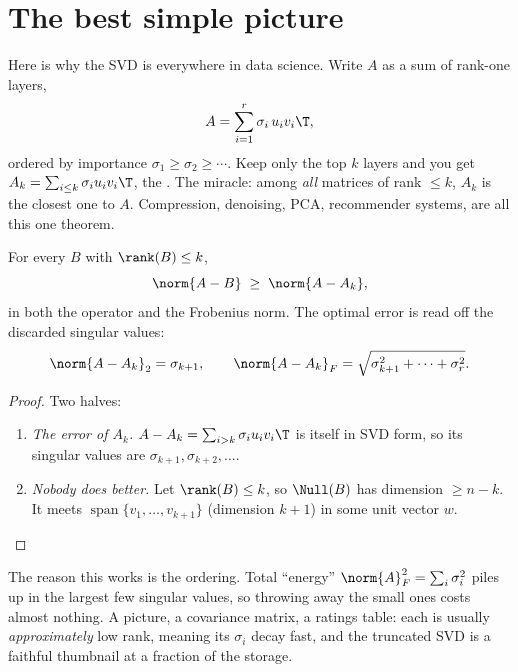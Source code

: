 \section{The best simple picture}\label{sec:eckart}
\quad{}

\begin{strand}
Here is why the SVD is everywhere in data science. Write $A$ as a sum of rank-one layers,
\[
  A=\sum_{i=1}^{r}\sigma_i\,u_i v_i\T ,
\]
ordered by importance $\sigma_1\ge\sigma_2\ge\cdots$. Keep only the top $k$ layers and you get
$A_k=\sum_{i\le k}\sigma_i u_i v_i\T$, the . The miracle: among \emph{all}
matrices of rank $\le k$, $A_k$ is the closest one to $A$. Compression, denoising, PCA,
recommender systems, are all this one theorem.
\end{strand}

\begin{theorem}\label{thm:ey}
For every $B$ with $\rank(B)\le k$,
\[
  \norm{A-B}\;\ge\;\norm{A-A_k},
\]
in both the operator and the Frobenius norm. The optimal error is read off the discarded
singular values:
\[
  \norm{A-A_k}_2=\sigma_{k+1},\qquad
  \norm{A-A_k}_F=\sqrt{\sigma_{k+1}^2+\cdots+\sigma_r^2}.
\]
\end{theorem}
\begin{proof}
Two halves:
\begin{enumerate}[leftmargin=2em,itemsep=1pt]
  \item \emph{The error of $A_k$.} $A-A_k=\sum_{i>k}\sigma_i u_i v_i\T$ is itself in SVD form, so
        its singular values are $\sigma_{k+1},\sigma_{k+2},\dots$. 
  \item \emph{Nobody does better.} Let $\rank(B)\le k$, so $\Null(B)$ has dimension $\ge n-k$.
        It meets $\operatorname{span}\{v_1,\dots,v_{k+1}\}$ (dimension $k+1$) in some unit vector $w$.
\end{enumerate}
\end{proof}

\begin{strand}
The reason this works is the ordering. Total ``energy'' $\norm{A}_F^2=\sum_i\sigma_i^2$ piles up in
the largest few singular values, so throwing away the small ones costs almost nothing. A picture,
a covariance matrix, a ratings table: each is usually \emph{approximately} low rank, meaning its
$\sigma_i$ decay fast, and the truncated SVD is a faithful thumbnail at a fraction of the storage.
\end{strand}

